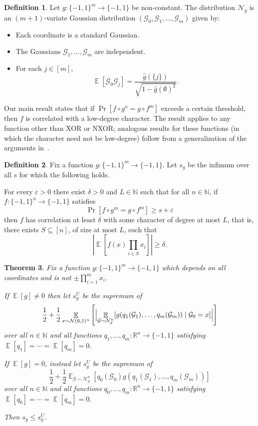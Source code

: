 \documentclass{article}
\newtheorem{theorem}{Theorem}[section]
\theoremstyle{definition}
\newtheorem{definition}[theorem]{Definition}
\theoremstyle{remark}
\DeclareMathOperator*{\E}{\mathbb{E}}
\providecommand{\cG}{\mathcal{G}}
\providecommand{\normal}{\mathcal{N}}
\providecommand{\normalg}[1]{\normal_{#1}}
\providecommand{\stdnormal}{\normal(0,1)}
\newcommand\eps{\varepsilon}
\renewcommand\epsilon{\eps}
\renewcommand\geq{\geqslant}
\renewcommand\leq{\leqslant}
\begin{document}
\begin{definition} \label{def:gaussian-g}
Let $g\colon \{-1,1\}^m \to \{-1,1\}$ be non-constant. The distribution $\normalg{g}$ is an $(m+1)$-variate Gaussian distribution $(\cG_0,\cG_1,\ldots,\cG_m)$ given by:
\begin{itemize}
    \item Each coordinate is a standard Gaussian.
    \item The Gaussians $\cG_1,\ldots,\cG_m$ are independent.
    \item For each $j \in [m]$,
    \[
     \E[\cG_0 \cG_j] = \frac{\hat{g}(\{j\})}{\sqrt{1 - \hat{g}(\emptyset)^2}}.
    \]
\end{itemize}
\end{definition}

Our main result states that if $\Pr[f \circ g^n = g \circ f^m]$ exceeds a certain threshold, then $f$ is correlated with a low-degree character. The result applies to any function other than XOR or NXOR; analogous results for these functions (in which the character need not be low-degree) follow from a generalization of the arguments in~\cite{Bellare}.

\begin{definition} \label{def:sg}
Fix a function $g\colon \{-1,1\}^m \to \{-1,1\}$. Let $s_g$ be the infimum over all $s$ for which the following holds.

For every $\epsilon > 0$ there exist $\delta > 0$ and $L \in \mathbb{N}$ such that for all $n \in \mathbb{N}$, if $f\colon \{-1,1\}^n \to \{-1,1\}$ satisfies
\[
 \Pr[f \circ g^m = g \circ f^m] \geq s + \epsilon
\]
then $f$ has correlation at least $\delta$ with some character of degree at most $L$, that is, there exists $S \subseteq [n]$, of size at most $L$, such that
\[
 \left| \E\left[ f(x) \prod_{i \in S} x_i \right] \right| \geq \delta.
\]
\end{definition}

\begin{theorem} \label{thm:list-decoding}
Fix a function $g\colon \{-1,1\}^m \to \{-1,1\}$ which depends on all coordinates and is not $\pm \prod_{i=1}^m x_i$.

If $\E[g] \neq 0$ then let $s_g^U$ be the supremum of
\[
 \frac{1}{2} + \frac{1}{2}
 \E_{x \sim \stdnormal^n}
 \left[\Bigl|
 \E_{\cG \sim \normalg{g}^n}[g(q_1(\cG_1), \ldots, q_m(\cG_m)) \mid \cG_0 = x]
 \Bigr|\right]
\]
over all $n \in \mathbb{N}$ and all functions $q_1,\ldots,q_m\colon \mathbb{R}^n \to \{-1,1\}$ satisfying $\E[q_1] = \cdots = \E[q_m] = 0$.

If $\E[g] = 0$, instead let $s_g^U$ be the supremum of
\[
 \frac{1}{2} + \frac{1}{2}
 \E_{\cG \sim \normalg{g}^n}[q_0(\cG_0) g(q_1(\cG_1), \ldots, q_m(\cG_m))]
\]
over all $n \in \mathbb{N}$ and all functions $q_0,\ldots,q_m\colon \mathbb{R}^n \to \{-1,1\}$ satisfying $\E[q_0] = \cdots = \E[q_m] = 0$.

Then $s_g \leq s_g^U$.
\end{theorem}
\end{document}
